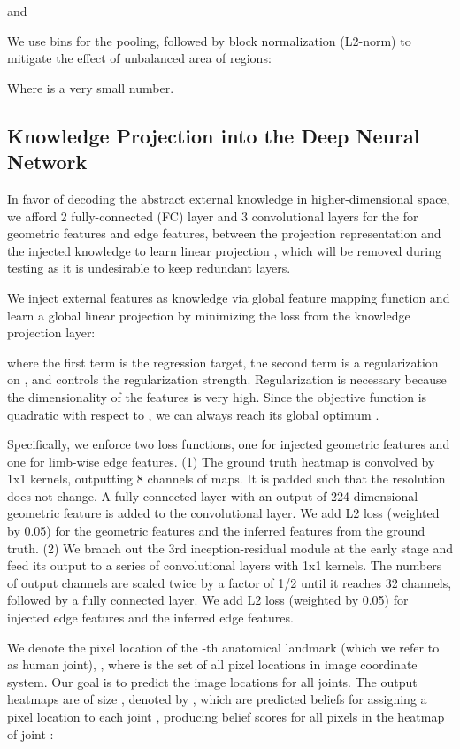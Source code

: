 \documentclass[journal ]{IEEEtran}
\begin{document}
and

We use  bins for the pooling, followed by block normalization (L2-norm) to mitigate the effect of unbalanced area of regions:

Where  is a very small number.

\subsection{Knowledge Projection into the Deep Neural Network}   

In favor of decoding the abstract external knowledge in higher-dimensional space, we afford 2 fully-connected (FC) layer and 3 convolutional layers for the for geometric features and edge features, between the projection representation and the injected knowledge to learn linear projection , which will be removed during testing as it is undesirable to keep redundant layers.

We inject external features as knowledge  via global feature mapping function  and learn a global linear projection  by minimizing the loss from the knowledge projection layer:

where the first term is the regression target, the second term is a  regularization on , and  controls the regularization strength. Regularization is necessary because the dimensionality of the features is very high. Since the objective function is quadratic with respect to , we can always reach its global optimum \cite{ren2014face}.

Specifically,  
we enforce two 
loss functions, one for injected geometric features and one for limb-wise edge features.  (1) The ground truth heatmap is convolved by 1x1 kernels, outputting 8 channels of maps. It is padded such that the resolution does not change. A fully connected layer with an output of 224-dimensional geometric feature is added to the convolutional layer. We add L2 loss (weighted by 0.05) for the geometric features and the inferred features from the ground truth. (2) We branch out the 3rd inception-residual module at the early stage and feed its output to a series of convolutional layers with 1x1 kernels. The numbers of output channels are scaled twice by a factor of 1/2 until it reaches 32 channels, followed by a fully connected layer. We add L2 loss (weighted by 0.05) for injected edge features and the inferred edge features. 


We denote the pixel location of the -th anatomical landmark (which we refer to as human joint), , where  is the set of all  pixel locations in image coordinate system. Our goal is to predict the image locations  for all  joints.
The output heatmaps are of size , denoted by , which are predicted beliefs for assigning a pixel location to each joint , producing belief scores  for all pixels in the heatmap of joint :  
\end{document}
